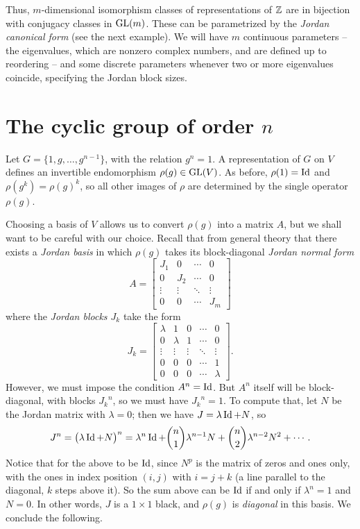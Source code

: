 Thus, \(m\)-dimensional isomorphism classes of representations of \(\mathbb{Z}\)
are in bijection with conjugacy classes in \(\operatorname{GL}(m)\). These can be
parametrized by the \emph{Jordan canonical form} (see the next
example). We will have \(m\) continuous parameters -- the eigenvalues,
which are nonzero complex numbers, and are defined up to reordering -- and
some discrete parameters whenever two or more eigenvalues coincide,
specifying the Jordan block sizes.

\section{The cyclic group of order \(n\)}
Let \(G=\{1,g,\dotsc,g^{n-1}\}\), with the relation \(g^n=1\). A
representation of \(G\) on \(V\) defines an invertible endomorphism
\(\rho(g)\in \operatorname{GL}(V)\). As before, \(\rho(1)=\operatorname{Id}\) and
\(\rho(g^k)=\rho(g)^k\), so all other images of \(\rho\) are determined by
the single operator \(\rho(g)\).

Choosing a basis of \(V\) allows us to convert \(\rho(g)\) into a matrix
\(A\), but we shall want to be careful with our choice. Recall that from
general theory that there exists a \emph{Jordan basis} in which \(\rho(g)\)
takes its block-diagonal \emph{Jordan normal form}
\[
  A=
  \begin{bmatrix}
    J_1&0&\cdots&0\\
    0&J_2&\cdots&0\\
    \vdots&\vdots&\ddots&\vdots\\
    0&0&\cdots&J_m
  \end{bmatrix}
\]
where the \emph{Jordan blocks \(J_k\)} take the form
\[
J_k=
\begin{bmatrix}
  \lambda&1&0&\cdots&0\\
  0&\lambda&1&\cdots&0\\
  \vdots&\vdots&\vdots&\ddots&\vdots\\
  0&0&0&\cdots&1\\
  0&0&0&\cdots&\lambda
\end{bmatrix}.
\]
However, we must impose the condition \(A^n=\operatorname{Id}\). But \(A^n\) itself will
be block-diagonal, with blocks \({J_k}^n\), so we must have
\({J_k}^n=1\). To compute that, let \(N\) be the Jordan matrix with
\(\lambda=0\); then we have \(J=\lambda\operatorname{Id}+N\), so
\[
J^n=\bigl(\lambda\operatorname{Id}+N\bigr)^n=\lambda^n\operatorname{Id}+\binom{n}{1}\lambda^{n-1}N+\binom{n}{2}\lambda^{n-2}N^2+\dotsb.
\]
Notice that for the above to be \(\operatorname{Id}\), since \(N^p\) is the matrix of
zeros and ones only, with the ones in index position \((i,j)\) with
\(i=j+k\) (a line parallel to the diagonal, \(k\) steps above it). So the
sum above can be \(\operatorname{Id}\) if and only if \(\lambda^n=1\) and \(N=0\). In
other words, \(J\) is a \(1\times 1\) black, and \(\rho(g)\) is
\emph{diagonal} in this basis. We conclude the following.

